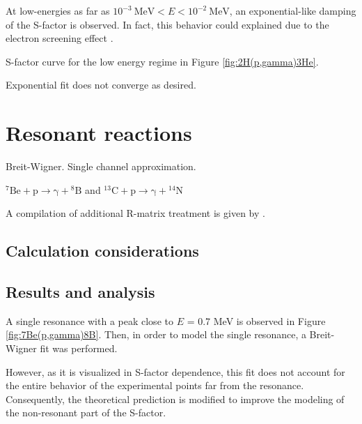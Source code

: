 \documentclass[openany]{book}
\begin{document}



At low-energies as far as $ \mathrm{10^{-3} \ MeV}  <  E<\mathrm{10^{-2} \ MeV}$, an exponential-like damping of the S-factor is observed. In fact, this  behavior could explained due to the electron screening effect \cite{raiola_migliardi_gyurky_aliotta_formicola_bonetti_broggini_campajola_corvisiero_costantini_et_2002}.


S-factor curve for the low energy regime in Figure \ref{fig:2H(p,gamma)3He}.

Exponential fit does not converge as desired.


\section{Resonant reactions} \label{sec:resonant}
Breit-Wigner. Single channel approximation.

$\mathrm{{}^{7}{Be} + p \rightarrow \gamma +  {}^{8}{B} } $ and $\mathrm{{}^{13}{C} + p  \rightarrow \gamma +  {}^{14}{N}} $

A compilation of additional R-matrix treatment is given by \cite{descouvemont_adahchour_angulo_coc_vangioni-flam_2004}.

\subsection{Calculation considerations} \label{sub:considerationsResonant}
\subsection{Results and analysis} \label{sub:resultsAnalysisResonant}


A single resonance with a peak close to $E$ = 0.7 MeV is observed in Figure \ref{fig:7Be(p,gamma)8B}. Then, in order to model the single resonance, a Breit-Wigner fit was performed.


However, as it is visualized in S-factor dependence, this fit does not account for the entire behavior of the experimental points far from the resonance. Consequently, the theoretical prediction is modified to improve the modeling of the non-resonant part of the S-factor.
\end{document}
